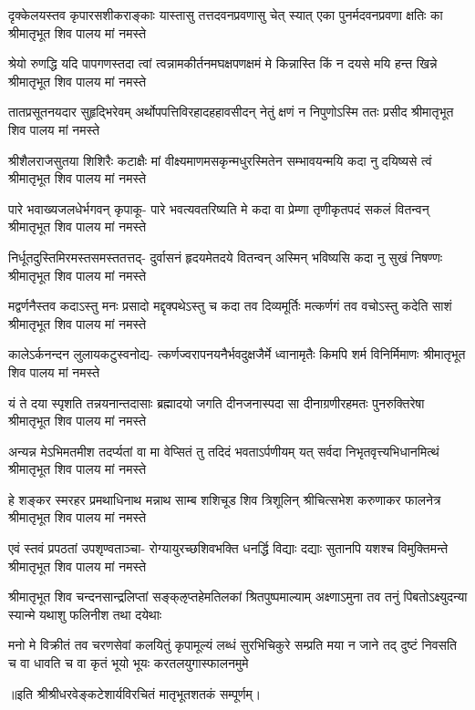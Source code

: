 \fourlineindentedshloka
{दृक्केलयस्तव कृपारसशीकराङ्काः}
{यास्तासु तत्तदवनप्रवणासु चेत् स्यात्}
{एका पुनर्मदवनप्रवणा क्षतिः का}
{श्रीमातृभूत शिव पालय मां नमस्ते} %

\fourlineindentedshloka
{श्रेयो रुणद्धि यदि पापगणस्तदा त्वां}
{त्वन्नामकीर्तनमघक्षपणक्षमं मे}
{किन्नास्ति किं न दयसे मयि हन्त खिन्ने}
{श्रीमातृभूत शिव पालय मां नमस्ते} %

\fourlineindentedshloka
{तातप्रसूतनयदार सुहृद्भिरेवम्}
{अर्थोपपत्तिविरहादहहावसीदन्}
{नेतुं क्षणं न निपुणोऽस्मि ततः प्रसीद}
{श्रीमातृभूत शिव पालय मां नमस्ते} %

\fourlineindentedshloka
{श्रीशैलराजसुतया शिशिरैः कटाक्षैः}
{मां वीक्ष्यमाणमसकृन्मधुरस्मितेन}
{सम्भावयन्मयि कदा नु दयिष्यसे त्वं}
{श्रीमातृभूत शिव पालय मां नमस्ते} %

\fourlineindentedshloka
{पारे भवाख्यजलधेर्भगवन् कृपाकू-}
{पारे भवत्यवतरिष्यति मे कदा वा}
{प्रेम्णा तृणीकृतपदं सकलं वितन्वन्}
{श्रीमातृभूत शिव पालय मां नमस्ते} %

\fourlineindentedshloka
{निर्धूतदुस्तिमिरमस्तसमस्ततत्तद्-}
{दुर्वासनं हृदयमेतदये वितन्वन्}
{अस्मिन् भविष्यसि कदा नु सुखं निषण्णः}
{श्रीमातृभूत शिव पालय मां नमस्ते} %

\fourlineindentedshloka
{मद्वर्णनैस्तव कदाऽस्तु मनः प्रसादो}
{मद्दृक्पथेऽस्तु च कदा तव दिव्यमूर्तिः}
{मत्कर्णगं तव वचोऽस्तु कदेति साशं}
{श्रीमातृभूत शिव पालय मां नमस्ते} %

\fourlineindentedshloka
{कालेऽर्कनन्दन लुलायकटुस्वनोद्य-}
{त्कर्णज्वरापनयनैर्भवदुक्षजैर्मे}
{ध्वानामृतैः किमपि शर्म विनिर्मिमाणः}
{श्रीमातृभूत शिव पालय मां नमस्ते} %

\fourlineindentedshloka
{यं ते दया स्पृशति तन्नयनान्तदासाः}
{ब्रह्मादयो जगति दीनजनास्पदा सा}
{दीनाग्रणीरहमतः पुनरुक्तिरेषा}
{श्रीमातृभूत शिव पालय मां नमस्ते} %

\fourlineindentedshloka
{अन्यन्न मेऽभिमतमीश तदर्प्यतां वा}
{मा वेप्सितं तु तदिदं भवताऽर्पणीयम्}
{यत् सर्वदा निभृतवृत्त्यभिधानमित्थं}
{श्रीमातृभूत शिव पालय मां नमस्ते} %

\fourlineindentedshloka
{हे शङ्कर स्मरहर प्रमथाधिनाथ}
{मन्नाथ साम्ब शशिचूड शिव त्रिशूलिन्}
{श्रीचित्सभेश करुणाकर फालनेत्र}
{श्रीमातृभूत शिव पालय मां नमस्ते} %

\fourlineindentedshloka
{एवं स्तवं प्रपठतां उपश‍ृण्वताञ्चा-}
{रोग्यायुरच्छशिवभक्ति धनर्द्धि विद्याः}
{दद्याः सुतानपि यशश्च विमुक्तिमन्ते}
{श्रीमातृभूत शिव पालय मां नमस्ते} %

\fourlineindentedshloka
{श्रीमातृभूत शिव चन्दनसान्द्रलिप्तां}
{सङ्क्ऌप्तहेमतिलकां श्रितपुष्पमाल्याम्}
{अक्ष्णाऽमुना तव तनुं पिबतोऽक्ष्युदन्या}
{स्यान्मे यथाशु फलिनीश तथा दयेथाः} %

\fourlineindentedshloka
{मनो मे विक्रीतं तव चरणसेवां कलयितुं}
{कृपामूल्यं लब्धं सुरभिचिकुरे सम्प्रति मया}
{न जाने तद् दुष्टं निवसति च वा धावति च वा}
{कृतं भूयो भूयः करतलयुगास्फालनमुमे} %

॥इति श्रीश्रीधरवेङ्कटेशार्यविरचितं मातृभूतशतकं सम्पूर्णम्।